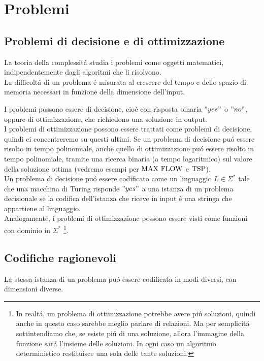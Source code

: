 \section{Problemi}

\subsection{Problemi di decisione e di ottimizzazione}
La teoria della complessitá studia i problemi come oggetti matematici, indipendentemente dagli algoritmi che li risolvono. \\
La difficoltá di un problema é misurata al crescere del tempo e dello spazio di memoria necessari in funzione della dimensione dell'input.

I problemi possono essere di decisione, cioé con risposta binaria $"yes"$ o $"no"$, 
oppure di ottimizzazione, che richiedono una soluzione in output. \\

I problemi di ottimizzazione possono essere trattati come problemi di decisione, quindi
ci concentreremo su questi ultimi. Se un problema di decisione puó essere risolto in tempo polinomiale,
anche quello di ottimizzazione puó essere risolto in tempo polinomiale, tramite una ricerca binaria (a tempo logaritmico)
sul valore della soluzione ottima (vedremo esempi per $\text{MAX FLOW}$ e $\text{TSP}$). \\

Un problema di decisione puó essere codificato come un linguaggio $L \in \Sigma^*$ 
tale che una macchina di Turing risponde $"yes"$ a una istanza di un problema decisionale 
se la codifica dell'istanza  che riceve in input é una stringa che appartiene al linguaggio. \\

Analogamente, i problemi di ottimizzazione possono essere visti come funzioni con dominio in $\Sigma^*$
\footnote{In realtá, un problema di ottimizzazione potrebbe avere piú soluzioni, quindi anche in questo caso sarebbe meglio
parlare di relazioni. Ma per semplicitá sottintendiamo che, se esiste piú di una soluzione,
allora l'immagine della funzione sará l'insieme delle soluzioni. In ogni caso un algoritmo deterministico restituisce una sola delle tante 
soluzioni.}.


\subsection{Codifiche ragionevoli}
La stessa istanza di un problema puó essere codificata in modi diversi, con dimensioni diverse. \\


